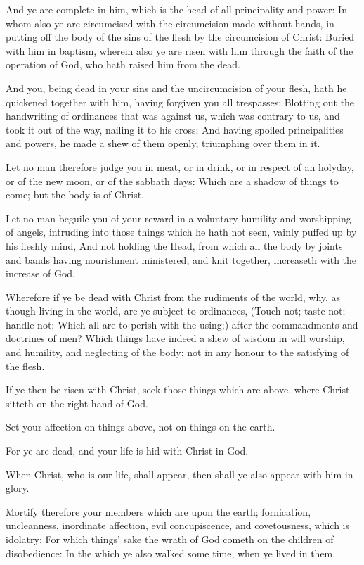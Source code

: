 \Verse And ye are complete in him, which is the head of all principality and power: \Verse In whom also ye are circumcised with the circumcision made without hands, in putting off the body of the sins of the flesh by the circumcision of Christ: \Verse Buried with him in baptism, wherein also ye are risen with him through the faith of the operation of God, who hath raised him from the dead.

\Verse And you, being dead in your sins and the uncircumcision of your flesh, hath he quickened together with him, having forgiven you all trespasses; \Verse Blotting out the handwriting of ordinances that was against us, which was contrary to us, and took it out of the way, nailing it to his cross; \Verse And having spoiled principalities and powers, he made a shew of them openly, triumphing over them in it.

\Verse Let no man therefore judge you in meat, or in drink, or in respect of an holyday, or of the new moon, or of the sabbath days: \Verse Which are a shadow of things to come; but the body is of Christ.

\Verse Let no man beguile you of your reward in a voluntary humility and worshipping of angels, intruding into those things which he hath not seen, vainly puffed up by his fleshly mind, \Verse And not holding the Head, from which all the body by joints and bands having nourishment ministered, and knit together, increaseth with the increase of God.

\Verse Wherefore if ye be dead with Christ from the rudiments of the world, why, as though living in the world, are ye subject to ordinances, \Verse (Touch not; taste not; handle not; \Verse Which all are to perish with the using;) after the commandments and doctrines of men?  \Verse Which things have indeed a shew of wisdom in will worship, and humility, and neglecting of the body: not in any honour to the satisfying of the flesh.


\Chapter
\Verse If ye then be risen with Christ, seek those things which are above, where Christ sitteth on the right hand of God.

\Verse Set your affection on things above, not on things on the earth.

\Verse For ye are dead, and your life is hid with Christ in God.

\Verse When Christ, who is our life, shall appear, then shall ye also appear with him in glory.

\Verse Mortify therefore your members which are upon the earth; fornication, uncleanness, inordinate affection, evil concupiscence, and covetousness, which is idolatry: \Verse For which things' sake the wrath of God cometh on the children of disobedience: \Verse In the which ye also walked some time, when ye lived in them.

